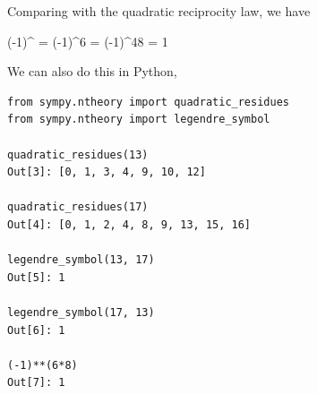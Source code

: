 Comparing with the quadratic reciprocity law, we have

\bee
(-1)^{ } = (-1)^{6 } = (-1)^{48} = 1
\eee

We can also do this in Python,

\begin{verbatim}
from sympy.ntheory import quadratic_residues
from sympy.ntheory import legendre_symbol

quadratic_residues(13)
Out[3]: [0, 1, 3, 4, 9, 10, 12]

quadratic_residues(17)
Out[4]: [0, 1, 2, 4, 8, 9, 13, 15, 16]

legendre_symbol(13, 17)
Out[5]: 1

legendre_symbol(17, 13)
Out[6]: 1

(-1)**(6*8)
Out[7]: 1
\end{verbatim}



